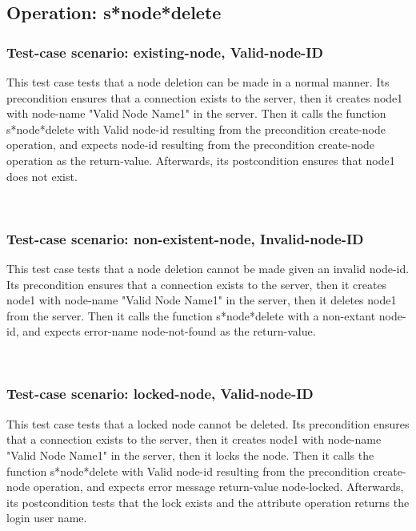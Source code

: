 \subsection {Operation: s*node*delete}
\subsubsection {Test-case scenario: existing-node, Valid-node-ID}


This test case tests that a node deletion can be made in a normal manner.
Its precondition ensures that a connection exists to the server, then it creates node1 with node-name "Valid Node Name1" in the server.
Then it calls the function s*node*delete  with Valid node-id resulting from the precondition create-node operation, and expects node-id resulting from the precondition create-node operation as the return-value.
Afterwards, its postcondition ensures that node1 does not exist.




\
\subsubsection {Test-case scenario: non-existent-node, Invalid-node-ID}


This test case tests that a node deletion cannot be made given an invalid node-id.
Its precondition ensures that a connection exists to the server, then it creates node1 with node-name "Valid Node Name1" in the server, then it deletes node1 from the server.
Then it calls the function s*node*delete  with a non-extant node-id, and expects error-name node-not-found as the return-value.





\
\subsubsection {Test-case scenario: locked-node, Valid-node-ID}


This test case tests that a locked node cannot be deleted.
Its precondition ensures that a connection exists to the server, then it creates node1 with node-name "Valid Node Name1" in the server, then it locks the node.
Then it calls the function s*node*delete  with Valid node-id resulting from the precondition create-node operation, and expects error message return-value node-locked.
Afterwards, its postcondition tests that the lock exists and the attribute operation returns the login user name.




